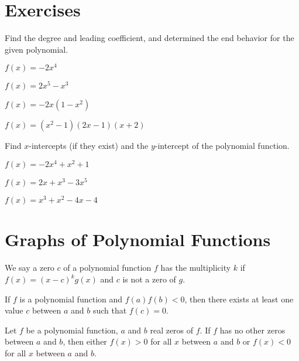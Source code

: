 \newpage

\section*{Exercises}

\begin{exercise}
  Find the degree and leading coefficient, and determined the end behavior for the given polynomial.\\
  \begin{enumerate*}
    \item $f(x)=-2x^4$
    \item $f(x)=2x^5-x^3$
    \item $f(x)=-2x(1-x^2)$
    \item $f(x)=(x^2-1)(2x-1)(x+2)$
  \end{enumerate*}
\end{exercise}

\begin{exercise}
  Find $x$-intercepts (if they exist) and the $y$-intercept of the polynomial function.\\
  \begin{enumerate*}
  \item $f(x)=-2x^4+x^2+1$
  \item $f(x)=2x+x^3-3x^5$
  \item $f(x)=x^{3} + x^{2} - 4 x - 4$
\end{enumerate*}
\end{exercise}

\newpage
\section{Graphs of Polynomial Functions}
\begin{definition}
  We say a zero $c$ of a polynomial function $f$ has the multiplicity $k$ if $f(x)=(x-c)^kg(x)$ and $c$ is not a zero of $g$.
\end{definition}

\begin{theorem}
  If $f$ is a polynomial function and $f(a)f(b)<0$, then there exists at least one value $c$ between $a$ and $b$ such that $f(c)=0$.
  \end{theorem}
  
  \begin{corollary}
    Let $f$ be a polynomial function, $a$ and $b$ real zeros of $f$. If $f$ has no other zeros between $a$ and $b$, then either $f(x)>0$ for all $x$ between $a$ and $b$ or $f(x)<0$ for all $x$ between $a$ and $b$.
  \end{corollary}
  
